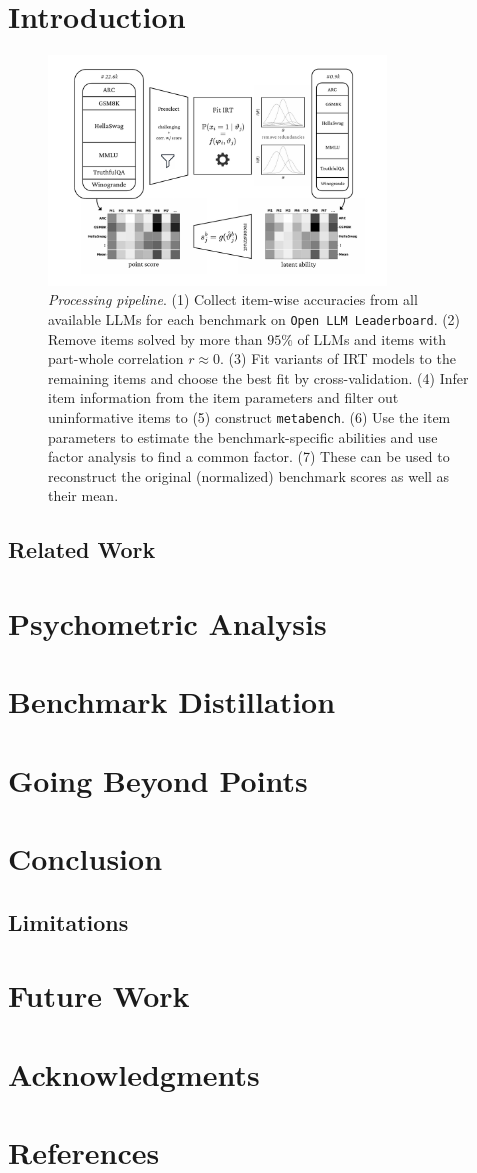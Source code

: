 \documentclass{article}
\begin{document}
\section{Introduction}
\begin{figure}[h]
   \centering
   \includegraphics[width=0.8\textwidth]{figures/overview.pdf}
   \caption{\textit{Processing pipeline}. (1) Collect item-wise accuracies from all available LLMs for each benchmark on \texttt{Open LLM Leaderboard}. (2) Remove items solved by more than $95\%$ of LLMs and items with part-whole correlation $r \approx 0$. (3) Fit variants of IRT models to the remaining items and choose the best fit by cross-validation. (4) Infer item information from the item parameters and filter out uninformative items to (5) construct \texttt{metabench}. (6) Use the item parameters to estimate the benchmark-specific abilities and use factor analysis to find a common factor. (7) These can be used to reconstruct the original (normalized) benchmark scores as well as their mean.}
   \label{fig:overview}
\end{figure}


\subsection{Related Work}
\section{Psychometric Analysis}
\section{Benchmark Distillation}
\section{Going Beyond Points}
\section{Conclusion}
\subsection{Limitations}
\section{Future Work}
\section*{Acknowledgments}
\section*{References}
\end{document}
